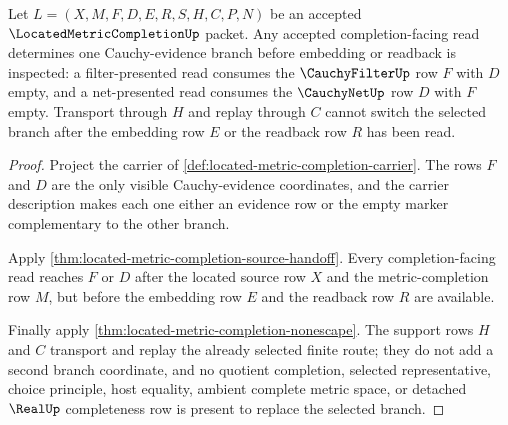 \begin{theorem}
\label{thm:located-metric-completion-branch-determinacy}
Let $L=(X,M,F,D,E,R,S,H,C,P,N)$ be an accepted $\LocatedMetricCompletionUp$ packet. Any accepted completion-facing read determines one Cauchy-evidence branch before embedding or readback is inspected: a filter-presented read consumes the $\CauchyFilterUp$ row $F$ with $D$ empty, and a net-presented read consumes the $\CauchyNetUp$ row $D$ with $F$ empty. Transport through $H$ and replay through $C$ cannot switch the selected branch after the embedding row $E$ or the readback row $R$ has been read.
\end{theorem}
\begin{proof}
Project the carrier of \autoref{def:located-metric-completion-carrier}. The rows $F$ and $D$ are the only visible Cauchy-evidence coordinates, and the carrier description makes each one either an evidence row or the empty marker complementary to the other branch.

Apply \autoref{thm:located-metric-completion-source-handoff}. Every completion-facing read reaches $F$ or $D$ after the located source row $X$ and the metric-completion row $M$, but before the embedding row $E$ and the readback row $R$ are available.

Finally apply \autoref{thm:located-metric-completion-nonescape}. The support rows $H$ and $C$ transport and replay the already selected finite route; they do not add a second branch coordinate, and no quotient completion, selected representative, choice principle, host equality, ambient complete metric space, or detached $\RealUp$ completeness row is present to replace the selected branch.
\end{proof}

